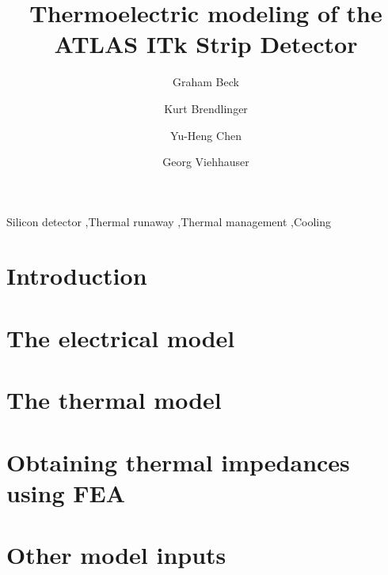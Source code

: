 \documentclass[preprint]{elsarticle/elsarticle}
\begin{document}
\begin{frontmatter}

\title{Thermoelectric modeling of the ATLAS ITk Strip Detector}
\author[1]{Graham Beck}      %
\author[2]{Kurt Brendlinger} %
\author[2]{Yu-Heng Chen}     %
\author[3]{Georg Viehhauser} %

\address[1]{Queen Mary University of London, London, UK}
\address[2]{Deutsches Elektronen-Synchrotron DESY, Notkestra{\ss}e 85, 22607 Hamburg}
\address[3]{Oxford University, Oxford, England, UK}

\begin{abstract}

\end{abstract}

\begin{keyword}
Silicon detector \sep Thermal runaway \sep Thermal management \sep Cooling
\end{keyword}

\end{frontmatter}

\section{Introduction}


\section{The electrical model}


\section{The thermal model}


\section{Obtaining thermal impedances using FEA}


\section{Other model inputs}

\end{document}
